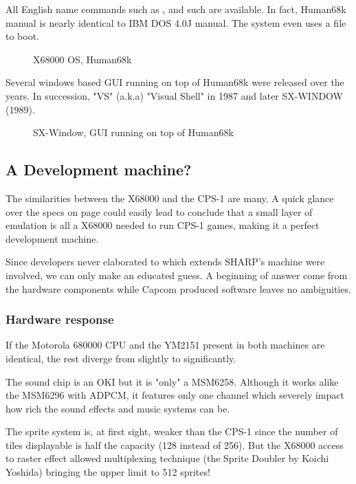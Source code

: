 All English name commands such as ,  and such are available. In fact, Human68k manual is nearly identical to IBM DOS 4.0J manual\cite{human68k_manual}. The system even uses a  file to boot.

\begin{figure}[H]
\caption*{X68000 OS, Human68k}
\end{figure}


Several windows based GUI running on top of Human68k were released over the years. In succession, "VS" (a.k.a) "Visual Shell" in 1987 and later SX-WINDOW (1989).

\begin{figure}[H]
\caption*{SX-Window, GUI running on top of Human68k}
\end{figure}



\subsection{A Development machine?}
The similarities between the X68000 and the CPS-1 are many. A quick glance over the specs on page \pageref{x68000-specs} could easily lead to conclude that a small layer of emulation is all a X68000 needed to run CPS-1 games, making it a perfect development machine. 

Since developers never elaborated to which extends SHARP's machine were involved, we can only make an educated guess. A beginning of answer come from the hardware components while Capcom produced software leaves no ambiguities.

\subsubsection{Hardware response}
If the Motorola 680000 CPU and the YM2151 present in both machines are identical, the rest diverge from slightly to significantly.

The sound chip is an OKI but it is "only" a MSM6258. Although it works alike the MSM6296 with ADPCM, it features only one channel which severely impact how rich the sound effects and music systems can be.

The sprite system is, at first sight, weaker than the CPS-1 since the number of tiles displayable is half the capacity (128 instead of 256). But the X68000 access to raster effect allowed multiplexing technique (the Sprite Doubler by Koichi Yoshida\cite{x68000spritedoubler}) bringing the upper limit to 512 sprites!

